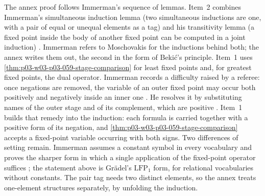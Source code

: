 The annex proof follows Immerman's sequence of lemmas. Item~2 combines
Immerman's simultaneous induction lemma (two simultaneous inductions are
one, with a pair of equal or unequal elements as a tag) and his
transitivity lemma (a fixed point inside the body of another fixed point
can be computed in a joint induction)
\cite[Lemmas~4.1--4.2 and Cor.~4.3, pp.~95--97]{Immerman1986}. Immerman
refers to Moschovakis for the inductions behind both; the annex writes them
out, the second in the form of Beki\'c's principle. Item~1 uses
\cref{thm:p03-w03-p03-059-stage-comparison} for least fixed points and, for
greatest fixed points, the dual operator. Immerman records a difficulty
raised by a referee: once negations are removed, the variable of an outer
fixed point may occur both positively and negatively inside an inner one
\cite[Lemma~4.7, p.~99]{Immerman1986}. He resolves it by substituting
names of the outer stage and of its complement, which are positive
\cite[p.~100]{Immerman1986}. Item~1 builds that remedy into the induction:
each formula is carried together with a positive form of its negation, and
\cref{thm:p03-w03-p03-059-stage-comparison} accepts a fixed-point variable
occurring with both signs. Two differences of setting remain. Immerman
assumes a constant symbol in every vocabulary and proves the sharper form
in which a single application of the fixed-point operator suffices
\cite[pp.~89, 94]{Immerman1986}; the statement above is Gr\"adel's
\(\mathrm{LFP}_1\) form, for relational vocabularies without constants. The
pair tag needs two distinct elements, so the annex treats one-element
structures separately, by unfolding the induction.

